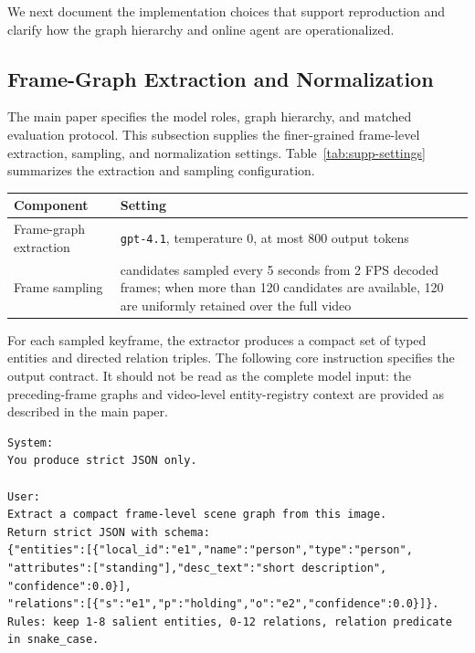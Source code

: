 \documentclass[11pt]{article}
\begin{document}
We next document the implementation choices that support reproduction and clarify how the graph hierarchy and online agent are operationalized.

\subsection{Frame-Graph Extraction and Normalization}

The main paper specifies the model roles, graph hierarchy, and matched evaluation protocol.
This subsection supplies the finer-grained frame-level extraction, sampling, and normalization settings.
Table~\ref{tab:supp-settings} summarizes the extraction and sampling configuration.

\begin{center}
  \centering
  \small
  \setlength{\tabcolsep}{4pt}
  \begin{tabularx}{\columnwidth}{@{}lY@{}}
    \toprule
    \textbf{Component} & \textbf{Setting} \\
    \midrule
    Frame-graph extraction &
    \texttt{gpt-4.1}, temperature 0, at most 800 output tokens \\
    Frame sampling &
    candidates sampled every 5 seconds from 2 FPS decoded frames; when more than 120 candidates are available, 120 are uniformly retained over the full video \\
    \bottomrule
  \end{tabularx}
  \label{tab:supp-settings}
\end{center}

For each sampled keyframe, the extractor produces a compact set of typed entities and directed relation triples.
The following core instruction specifies the output contract.
It should not be read as the complete model input: the preceding-frame graphs and video-level entity-registry context are provided as described in the main paper.

\begin{lstlisting}
System:
You produce strict JSON only.

User:
Extract a compact frame-level scene graph from this image.
Return strict JSON with schema:
{"entities":[{"local_id":"e1","name":"person","type":"person",
"attributes":["standing"],"desc_text":"short description",
"confidence":0.0}],
"relations":[{"s":"e1","p":"holding","o":"e2","confidence":0.0}]}.
Rules: keep 1-8 salient entities, 0-12 relations, relation predicate in snake_case.
\end{lstlisting}
\end{document}
